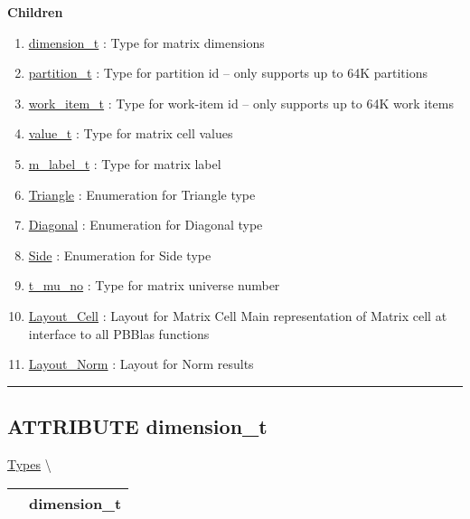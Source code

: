 \textbf{Children}
\begin{enumerate}
\item \hyperlink{ecldoc:pbblas.types.dimension_t}{dimension\_t}
: Type for matrix dimensions
\item \hyperlink{ecldoc:pbblas.types.partition_t}{partition\_t}
: Type for partition id -- only supports up to 64K partitions
\item \hyperlink{ecldoc:pbblas.types.work_item_t}{work\_item\_t}
: Type for work-item id -- only supports up to 64K work items
\item \hyperlink{ecldoc:pbblas.types.value_t}{value\_t}
: Type for matrix cell values
\item \hyperlink{ecldoc:pbblas.types.m_label_t}{m\_label\_t}
: Type for matrix label
\item \hyperlink{ecldoc:ecldoc-Triangle}{Triangle}
: Enumeration for Triangle type
\item \hyperlink{ecldoc:ecldoc-Diagonal}{Diagonal}
: Enumeration for Diagonal type
\item \hyperlink{ecldoc:ecldoc-Side}{Side}
: Enumeration for Side type
\item \hyperlink{ecldoc:pbblas.types.t_mu_no}{t\_mu\_no}
: Type for matrix universe number
\item \hyperlink{ecldoc:pbblas.types.layout_cell}{Layout\_Cell}
: Layout for Matrix Cell Main representation of Matrix cell at interface to all PBBlas functions
\item \hyperlink{ecldoc:pbblas.types.layout_norm}{Layout\_Norm}
: Layout for Norm results
\end{enumerate}

\rule{\linewidth}{0.5pt}

\subsection*{\textsf{\colorbox{headtoc}{\color{white} ATTRIBUTE}
dimension\_t}}

\hypertarget{ecldoc:pbblas.types.dimension_t}{}
\hspace{0pt} \hyperlink{ecldoc:PBblas.Types}{Types} \textbackslash 

{\renewcommand{\arraystretch}{1.5}
\begin{tabularx}{\textwidth}{|>{\raggedright\arraybackslash}l|X|}
\hline
\hspace{0pt}\mytexttt{\color{red} } & \textbf{dimension\_t} \\
\hline
\end{tabularx}
}

